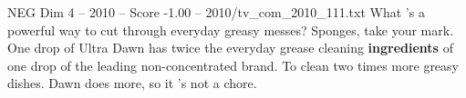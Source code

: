 \begin{textsample}{NEG Dim 4 – 2010 – Score -1.00 – 2010/tv\_com\_2010\_111.txt}  \label{ex:f4_neg_043}
What 's a powerful way to cut through everyday greasy messes?
Sponges, take your mark.
One drop of Ultra Dawn has twice the everyday grease cleaning \textbf{ingredients} of one drop of the leading non-concentrated brand.
To clean two times more greasy dishes.
Dawn does more, so it 's not a chore.

\end{textsample}
